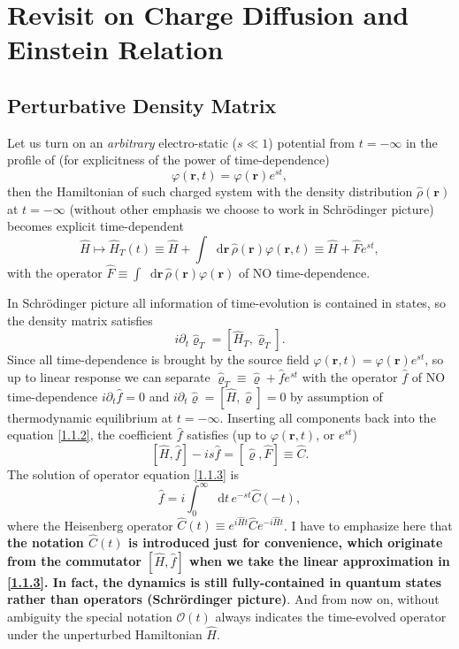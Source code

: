\documentclass[10pt,nofootinbib,letterpaper]{revtex4}
\newcommand*\dd{\mathop{}\!\mathrm{d}}
\newcounter{Claim}[section]
\newenvironment{Claim}[1][]{{\par\normalfont\bfseries \underline{Claim~\stepcounter{Claim}\arabic{Claim}.}~#1~~}}{\par}
\begin{document}
\section{Revisit on Charge Diffusion and Einstein Relation}
	\subsection{Perturbative Density Matrix}
		Let us turn on an \emph{arbitrary} electro-static ($s\ll1$) potential from $t=-\infty$ in the profile of (for explicitness of the power of time-dependence)
		\begin{equation*}
			\varphi(\bm{r},t)=\varphi(\bm{r})e^{st},
		\end{equation*}
		then the Hamiltonian of such charged system with the density distribution $\hat\rho(\bm{r})$ at $t=-\infty$ (without other emphasis {\color{red}we choose to work in Schr\"{o}dinger picture}) becomes explicit time-dependent
		\begin{equation}\label{1.1.1}
			\hat H\mapsto\hat{H}_T(t)\equiv\hat H+\int\dd\bm{r}\,\hat\rho(\bm{r})\varphi(\bm{r},t)\equiv\hat H+\hat F e^{st},
		\end{equation}
		with the operator $\hat{F}\equiv\int\dd\bm{r}\,\hat\rho(\bm{r})\varphi(\bm{r})$ of NO time-dependence.\par
		\indent In Schr\"{o}dinger picture all information of time-evolution is contained in states, so the density matrix satisfies
		\begin{equation}\label{1.1.2}
			i\partial_t\hat{\varrho}_T=[\hat{H}_T,\hat\varrho_T].
		\end{equation}
		Since all time-dependence is brought by the source field $\varphi(\bm{r},t)=\varphi(\bm{r})e^{st}$, so up to linear response we can separate $\hat{\varrho}_T\equiv\hat{\varrho}+\hat{f}e^{st}$ with the operator $\hat{f}$ of NO time-dependence $i\partial_t\hat f=0$ and $i\partial_t\hat\varrho=[\hat H,\hat \varrho]=0$ by assumption of thermodynamic equilibrium at $t=-\infty$. Inserting all components back into the equation \eqref{1.1.2}, the coefficient $\hat{f}$ satisfies (up to $\varphi(\bm{r},t)$, or $e^{st}$)
		\begin{equation}\label{1.1.3}
			[\hat H,\hat f]-is\hat{f}=[\hat\varrho,\hat F]\equiv\hat C.
		\end{equation}
		\begin{Claim}
			The solution of operator equation \eqref{1.1.3} is
			\begin{equation}\label{1.1.4}
				\hat{f}=i\int_0^\infty\dd t\, e^{-st}\hat{C}(-t),
			\end{equation}
			where the Heisenberg operator $\hat{C}(t)\equiv e^{i\hat Ht}\hat Ce^{-i\hat H t}$. I have to emphasize here that \textbf{the notation $\hat{C}(t)$ is introduced just for convenience, which originate from the commutator $[\hat H,\hat f]$ when we take the linear approximation in \eqref{1.1.3}. In fact, the dynamics is still fully-contained in quantum states rather than operators (Schr\"{o}rdinger picture)}. And from now on, without ambiguity the special notation $\mathcal{O}(t)$ always indicates the time-evolved operator under the unperturbed Hamiltonian $\hat{H}$. 
		\end{Claim}
\end{document}
